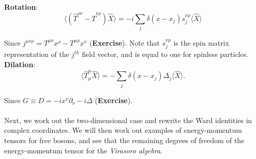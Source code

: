 \noindent \textbf{Rotation}: \\

\begin{equation}
\langle (\hat{T}^{\rho\nu} - \hat{T}^{\nu\rho} ) \hat{X} \rangle = -i \sum_j \delta(x-x_j) s_j^{\nu\rho} \langle \hat{X} \rangle
\end{equation}

\noindent Since $j^{\mu\nu\rho} = T^{\mu\nu} x^\rho - T^{\mu\rho} x^\nu$ (\textbf{Exercise}). Note that $s_j^{\nu\rho}$ is the spin matrix representation of the $j^{th}$ field vector, and is equal to one for spinless particles. \\

\noindent \textbf{Dilation}: \\

\begin{equation}
\langle \hat{T}^\mu_\mu \hat{X} \rangle = - \sum_j \delta(x-x_j) \Delta_j \langle \hat{X} \rangle.
\end{equation}

\noindent Since $G \equiv D = -i x^\nu \partial_\nu - i \Delta$ (\textbf{Exercise}). \\ \\

\noindent Next, we work out the two-dimensional case and rewrite the Ward identities in complex coordinates. We will then work out examples of energy-momentum tensors for free bosons, and see that the remaining degrees of freedom of the energy-momentum tensor for the \textit{Virasoro algebra}.